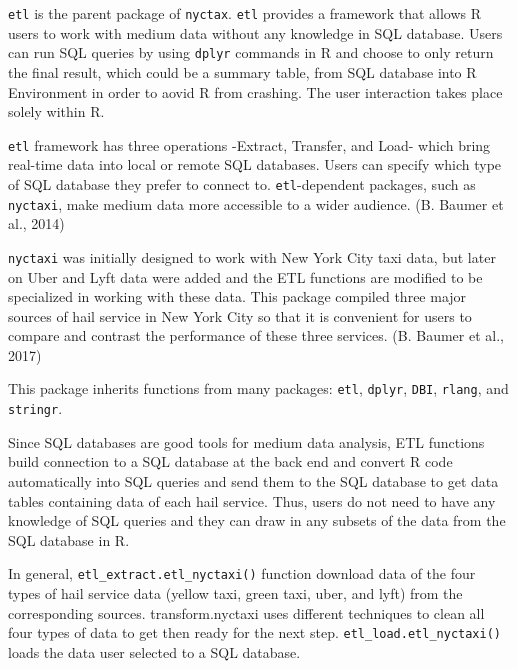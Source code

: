 \documentclass[12pt,twoside]{reedthesis}
\theoremstyle{definition}
\theoremstyle{definition}
\theoremstyle{definition}
\theoremstyle{remark}
\begin{document}
\texttt{etl} is the parent package of \texttt{nyctax}. \texttt{etl}
provides a framework that allows R users to work with medium data
without any knowledge in SQL database. Users can run SQL queries by
using \texttt{dplyr} commands in R and choose to only return the final
result, which could be a summary table, from SQL database into R
Environment in order to aovid R from crashing. The user interaction
takes place solely within R.

\texttt{etl} framework has three operations -Extract, Transfer, and
Load- which bring real-time data into local or remote SQL databases.
Users can specify which type of SQL database they prefer to connect to.
\texttt{etl}-dependent packages, such as \texttt{nyctaxi}, make medium
data more accessible to a wider audience. (B. Baumer et al., 2014)

\texttt{nyctaxi} was initially designed to work with New York City taxi
data, but later on Uber and Lyft data were added and the ETL functions
are modified to be specialized in working with these data. This package
compiled three major sources of hail service in New York City so that it
is convenient for users to compare and contrast the performance of these
three services. (B. Baumer et al., 2017)

This package inherits functions from many packages: \texttt{etl},
\texttt{dplyr}, \texttt{DBI}, \texttt{rlang}, and \texttt{stringr}.

Since SQL databases are good tools for medium data analysis, ETL
functions build connection to a SQL database at the back end and convert
R code automatically into SQL queries and send them to the SQL database
to get data tables containing data of each hail service. Thus, users do
not need to have any knowledge of SQL queries and they can draw in any
subsets of the data from the SQL database in R.

In general, \texttt{etl\_extract.etl\_nyctaxi()} function download data
of the four types of hail service data (yellow taxi, green taxi, uber,
and lyft) from the corresponding sources. transform.nyctaxi uses
different techniques to clean all four types of data to get then ready
for the next step. \texttt{etl\_load.etl\_nyctaxi()} loads the data user
selected to a SQL database.
\end{document}

